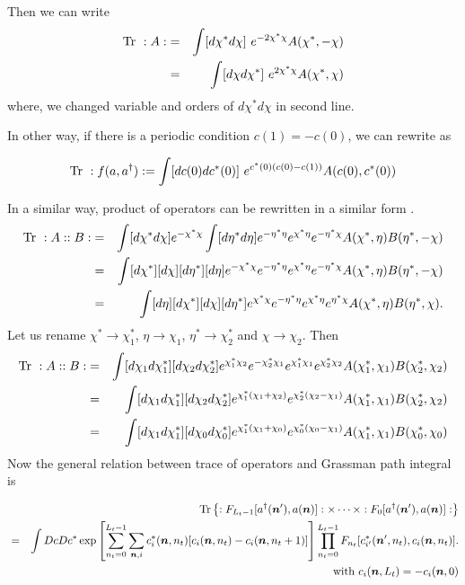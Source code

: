 \documentclass[10pt]{book}
\def\bm{\boldsymbol}
\newcommand{\bea}{\begin{eqnarray}}
\newcommand{\eea}{\end{eqnarray}}
\newcommand{\no}{\nonumber \\}
\def\vn{{\bm n}}
\begin{document}
Then we can write 
\bea 
{\rm Tr}\ :A: &=&\int [d\chi^* d\chi]\ e^{-2\chi^*\chi}A(\chi^*,-\chi) \no  
            &=&\int [d\chi d\chi^*]\ e^{2 \chi^*\chi} A(\chi^*,\chi)      
\eea 
where, we changed variable and orders of $d\chi^* d\chi $ in second line. 

In other way, if there is a periodic condition $c(1)=-c(0)$, we can rewrite as
\begin{framed}
\bea 
{\rm Tr}\ :f(a,a^\dagger) : =\int [dc(0) dc^*(0)]\ e^{c^*(0)(c(0)-c(1))} A(c(0),c^* (0)) 
\eea 
\end{framed}

In a similar way, product of operators can be rewritten in a similar form .
\bea 
{\rm Tr}\ :A::B:&=&\int[d\chi^* d\chi] e^{-\chi^*\chi}
               \int[d\eta^* d\eta] e^{-\eta^*\eta} 
                                   e^{\chi^*\eta} e^{-\eta^*\chi} 
               A(\chi^*,\eta)B(\eta^*,-\chi) \no 
          &=&\int[d\chi^*] [d\chi] 
                 [d\eta^*] [d\eta] e^{-\chi^*\chi} e^{-\eta^*\eta} 
                         e^{\chi^*\eta} e^{-\eta^*\chi} 
                         A(\chi^*,\eta)B(\eta^*,-\chi) \no
          &=&\int [d\eta] [d\chi^*][d\chi] 
                 [d\eta^*] e^{\chi^*\chi} e^{-\eta^*\eta} 
                            e^{\chi^*\eta} e^{\eta^*\chi} 
                             A(\chi^*,\eta)B(\eta^*,\chi).                       
\eea 
Let us rename $\chi^*\to \chi_1^*$, $\eta\to \chi_1$, $\eta^*\to\chi_2^*$
and $\chi\to \chi_2$. Then
\bea 
{\rm Tr}\ :A::B:&=&\int [d\chi_1 d\chi^*_1][d\chi_2d\chi^*_2] 
                    e^{\chi^*_1\chi_2} e^{-\chi^*_2\chi_1} 
                            e^{\chi^*_1\chi_1} e^{\chi_2^*\chi_2} 
              A(\chi^*_1,\chi_1)B(\chi^*_2,\chi_2)\no 
            &=&\int [d\chi_1 d\chi^*_1][d\chi_2d\chi^*_2] 
                   e^{\chi^*_1(\chi_1+ \chi_2)} 
                   e^{\chi^*_2(\chi_2-\chi_1)}
                          A(\chi^*_1,\chi_1)B(\chi^*_2,\chi_2)\no 
           &=&\int [d\chi_1 d\chi^*_1][d\chi_0d\chi^*_0] 
                              e^{\chi^*_1(\chi_1+ \chi_0)} 
                              e^{\chi^*_0(\chi_0-\chi_1)}
                                     A(\chi^*_1,\chi_1)B(\chi^*_0,\chi_0)                 
\eea 
Now the general relation between trace of operators
and Grassman path integral is 
\begin{framed}
\bea
& &{\rm Tr}\left\{ : F_{L_t-1}[a^\dagger({\bm n}'),a({\bm n}) ]:\times \cdots \times 
   :F_{0}[a^\dagger({\bm n}'),a({\bm n}) ]:\right\}  \no 
&=&\int Dc Dc^* \exp\left[\sum_{n_t=0}^{L_t-1}\sum_{\vn, i}
    c^*_i(\vn,n_t)[c_i(\vn,n_t)-c_i(\vn,n_t+1)] \right]
    \prod_{n_t=0}^{L_t-1} F_{n_t}[c^*_{i'}(\vn',n_t),c_i(\vn,n_t)].\no  
& & \mbox{ with } c_i(\vn,L_t)=-c_i(\vn,0)
\eea 
\end{framed}
\end{document}
